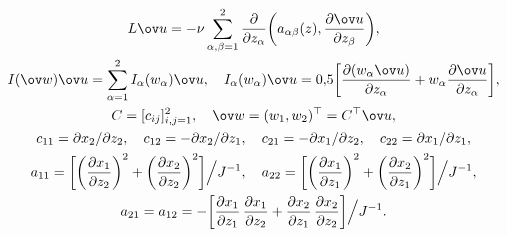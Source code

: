 \begin{gather*}


L\ov u=-\nu


\sum_{\alpha,\beta=1}^2\frac{\partial}


{\partial z_\alpha}\bigg(a_{\alpha\beta}(z),


\frac{\partial\ov u}{\partial z_\beta}\bigg),\\


%


I(\ov w)\ov u=\sum_{\alpha=1}^2I_\alpha(w_\alpha)


\ov u, \quad I_\alpha(w_\alpha)\ov


u=0{,}5\bigg[\frac{\partial


(w_\alpha\ov u)}{\partial z_\alpha}+w_\alpha


\frac{\partial\ov u}{\partial z_\alpha}\bigg],\\


%


C=[c_{ij}]_{i,j=1}^2, \quad \ov w=(w_1,w_2)^\top=C^\top\ov u,\\


%


c_{11}=\partial x_2/\partial z_2, \quad c_{12}=-\partial


x_2/\partial z_1, \quad c_{21}=-\partial x_1/\partial z_2, \quad


c_{22}=\partial x_1/\partial z_1,\\


%


a_{11}=\bigg[\bigg(\frac{\partial x_1}


{\partial z_2}\bigg)^2+\bigg(\frac{\partial x_2}


{\partial z_2}\bigg)^2\bigg]\Big/J^{-1},


\quad a_{22}=\bigg[\bigg(\frac{\partial x_1}


{\partial z_1}\bigg)^2+\bigg(\frac{\partial x_2}


{\partial z_1}\bigg)^2\bigg]\Big/J^{-1},\\


%


a_{21}=a_{12}=-\bigg[\frac{\partial x_1}


{\partial z_1}\,\frac{\partial x_1}


{\partial z_2}+\frac{\partial x_2}


{\partial z_1}\,\frac{\partial x_2}


{\partial z_2}\bigg]\Big/J^{-1}.


\end{gather*}


